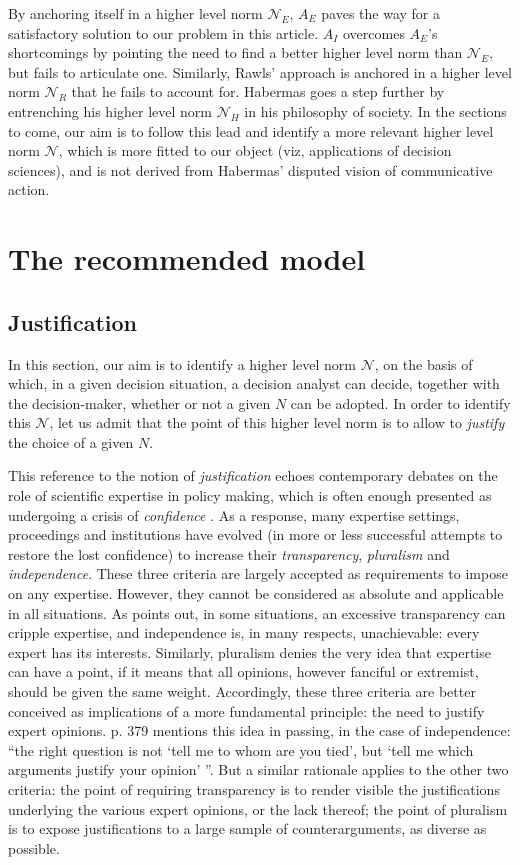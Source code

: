 \documentclass[preprint, french, english, 11pt, authoryear]{elsarticle}%
\newcommand{\adv}{\mathscr{N}}
\begin{document}
By anchoring itself in a higher level norm $\mathscr{N}_E$, $A_E$ paves the way for a satisfactory solution to our problem in this article. $A_I$ overcomes $A_E$'s shortcomings by pointing the need to find a better higher level norm than $\mathscr{N}_E$, but fails to articulate one. Similarly, Rawls' approach is anchored in a higher level norm $\mathscr{N}_{R}$ that he fails to account for. Habermas goes a step further by entrenching his higher level norm $\mathscr{N}_{H}$ in his philosophy of society. In the sections to come, our aim is to follow this lead and identify a more relevant higher level norm $\adv$, which is more fitted to our object (viz, applications of decision sciences), and is not derived from Habermas' disputed vision of communicative action.

\section{The recommended model}
\subsection{Justification}
In this section, our aim is to identify a higher level norm $\adv$, on the basis of which, in a given decision situation, a decision analyst can decide, together with the decision-maker, whether or not a given $N$ can be adopted. In order to identify this $\adv$, let us admit that the point of this higher level norm is to allow to \emph{justify} the choice of a given $N$.

This reference to the notion of \emph{justification} echoes contemporary debates on the role of scientific expertise in policy making, which is often enough presented as undergoing a crisis of \emph{confidence} \citep{godard_environnement_2015}. As a response, many expertise settings, proceedings and institutions have evolved (in more or less successful attempts to restore the lost confidence) to increase their \emph{transparency}, \emph{pluralism} and \emph{independence}. These three criteria are largely accepted as requirements to impose on any expertise. However, they cannot be considered as absolute and applicable in all situations. As \citet{godard_environnement_2015} points out, in some situations, an excessive transparency can cripple expertise, and independence is, in many respects, unachievable: every expert has its interests. Similarly, pluralism denies the very idea that expertise can have a point, if it means that all opinions, however fanciful or extremist, should be given the same weight. Accordingly, these three criteria are better conceived as implications of a more fundamental principle: the need to justify expert opinions. \citet{godard_environnement_2015} p. 379 mentions this idea in passing, in the case of independence: “the right question is not `tell me to whom are you tied', but `tell me which arguments justify your opinion' ”. But a similar rationale applies to the other two criteria: the point of requiring transparency is to render visible the justifications underlying the various expert opinions, or the lack thereof; the point of pluralism is to expose justifications to a large sample of counterarguments, as diverse as possible.
\end{document}
